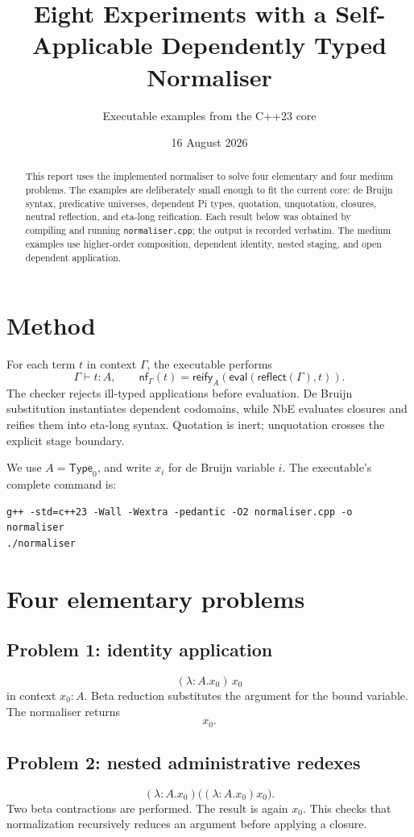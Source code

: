 \documentclass[11pt,a4paper]{article}
\title{Eight Experiments with a Self-Applicable Dependently Typed Normaliser}
\author{Executable examples from the C++23 core}
\date{16 August 2026}
\newcommand{\Ty}{\mathsf{Type}}
\newcommand{\nf}{\mathsf{nf}}
\begin{document}
\maketitle
\begin{abstract}
This report uses the implemented normaliser to solve four elementary and four medium problems. The examples are deliberately small enough to fit the current core: de Bruijn syntax, predicative universes, dependent Pi types, quotation, unquotation, closures, neutral reflection, and eta-long reification. Each result below was obtained by compiling and running \texttt{normaliser.cpp}; the output is recorded verbatim. The medium examples use higher-order composition, dependent identity, nested staging, and open dependent application.
\end{abstract}

\section{Method}
For each term $t$ in context $\Gamma$, the executable performs
\[
\Gamma\vdash t:A,
\qquad
\nf_\Gamma(t)=\mathsf{reify}_A(\mathsf{eval}(\mathsf{reflect}(\Gamma),t)).
\]
The checker rejects ill-typed applications before evaluation. De Bruijn substitution instantiates dependent codomains, while NbE evaluates closures and reifies them into eta-long syntax. Quotation is inert; unquotation crosses the explicit stage boundary.

We use $A=\Ty_0$, and write $x_i$ for de Bruijn variable $i$. The executable's complete command is:
\begin{lstlisting}
g++ -std=c++23 -Wall -Wextra -pedantic -O2 normaliser.cpp -o normaliser
./normaliser
\end{lstlisting}

\section{Four elementary problems}
\subsection{Problem 1: identity application}
\[
(\lambda:A.x_0)\,x_0
\]
in context $x_0:A$. Beta reduction substitutes the argument for the bound variable. The normaliser returns
\[
\boxed{x_0}.
\]

\subsection{Problem 2: nested administrative redexes}
\[
(\lambda:A.x_0)\bigl((\lambda:A.x_0)x_0\bigr).
\]
Two beta contractions are performed. The result is again $x_0$. This checks that normalization recursively reduces an argument before applying a closure.
\end{document}
